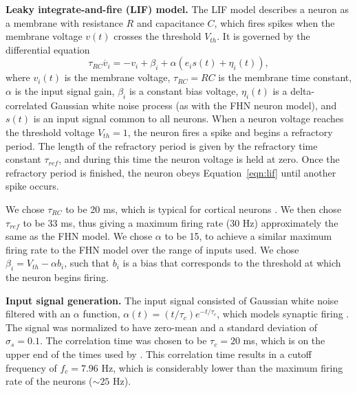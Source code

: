 \documentclass[12pt]{article}
\begin{document}
\textbf{Leaky integrate-and-fire (LIF) model.} The LIF model describes a neuron as a membrane with resistance $R$ and capacitance $C$, which fires spikes when the membrane voltage $v(t)$ crosses the threshold $V_{th}$. It is governed by the differential equation
\begin{equation}
  \tau_{RC} \dot{v_i} = -v_i + \beta_i + \alpha \left( e_i s(t) + \eta_i(t) \right),
  \label{eqn:lif}
\end{equation}
where $v_i(t)$ is the membrane voltage, $\tau_{RC} = RC$ is the membrane time constant, $\alpha$ is the input signal gain, $\beta_i$ is a constant bias voltage, $\eta_i(t)$ is a delta-correlated Gaussian white noise process (as with the FHN neuron model), and $s(t)$ is an input signal common to all neurons. When a neuron voltage reaches the threshold voltage $V_{th} = 1$, the neuron fires a spike and begins a refractory period. The length of the refractory period is given by the refractory time constant $\tau_{ref}$, and during this time the neuron voltage is held at zero. Once the refractory period is finished, the neuron obeys Equation~\ref{eqn:lif} until another spike occurs.

We chose $\tau_{RC}$ to be 20 ms, which is typical for cortical neurons \citep{McCormick1985}. We then chose $\tau_{ref}$ to be 33 ms, thus giving a maximum firing rate (30 Hz) approximately the same as the FHN model. We chose $\alpha$ to be 15, to achieve a similar maximum firing rate to the FHN model over the range of inputs used. We chose $\beta_i = V_{th} - \alpha b_i$, such that $b_i$ is a bias that corresponds to the threshold at which the neuron begins firing.


\textbf{Input signal generation.} The input signal consisted of Gaussian white noise filtered with an $\alpha$ function, $\alpha(t) = (t / \tau_c) e^{-t / \tau_c}$, which models synaptic firing \citep{Galan2008}. The signal was normalized to have zero-mean and a standard deviation of $\sigma_s = 0.1$. The correlation time was chosen to be $\tau_c = 20$ ms, which is on the upper end of the times used by \cite{Mainen1995}. This correlation time results in a cutoff frequency of $f_c = 7.96$ Hz, which is considerably lower than the maximum firing rate of the neurons ($\sim 25$ Hz).
\end{document}
